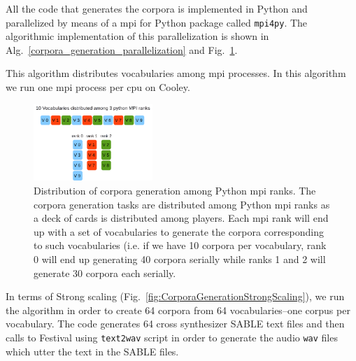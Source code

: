 \documentclass[11pt,a4paper]{article}
\begin{document}
All the code that generates the corpora is implemented in Python and parallelized by means of a \gls{mpi} for Python package called \texttt{mpi4py}. The algorithmic implementation of this parallelization is shown in Alg.~\ref{corpora_generation_parallelization} and Fig.~\ref{fig:CorporaGenerationParallelization}.

\begin{algorithm}
	\caption{This algorithm distributes vocabularies among \gls{mpi} processes. In this algorithm we run one \gls{mpi} process per \gls{cpu} on Cooley.}
\label{corpora_generation_parallelization}
\begin{algorithmic}[1]
			\ENDFOR
		\ENDIF
	\ENDFOR
\end{algorithmic}
\end{algorithm}

\begin{figure}[h!]
    \centering
    \includegraphics[width=0.4\textwidth]{CorporaGenerationParallelization.png}
    \caption{Distribution of corpora generation among Python \gls{mpi} ranks. The corpora generation tasks are distributed among Python \gls{mpi} ranks as a deck of cards is distributed among players. Each \gls{mpi} rank will end up with a set of vocabularies to generate the corpora corresponding to such vocabularies (i.e. if we have 10 corpora per vocabulary, rank 0 will end up generating 40 corpora serially while ranks 1 and 2 will generate 30 corpora each serially.}
    \label{fig:CorporaGenerationParallelization}
\end{figure}

In terms of Strong scaling (Fig.~\ref{fig:CorporaGenerationStrongScaling}), we run the algorithm in order to create 64 corpora from 64 vocabularies--one corpus per vocabulary. The code generates 64 cross synthesizer SABLE text files and then calls to Festival using \texttt{text2wav} script in order to generate the audio \texttt{wav} files which utter the text in the SABLE files.
\end{document}
